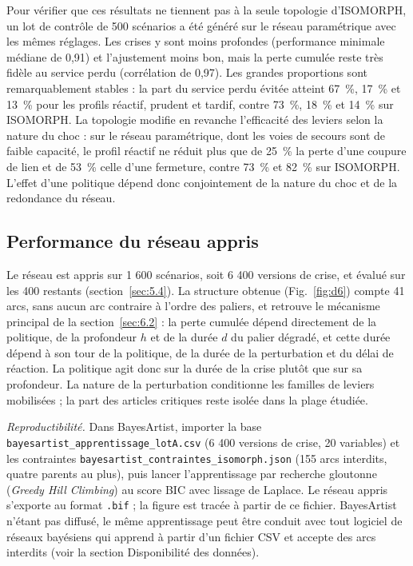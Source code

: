Pour vérifier que ces résultats ne tiennent pas à la seule topologie d'ISOMORPH, un lot de contrôle de 500 scénarios a été généré sur le réseau paramétrique avec les mêmes réglages. Les crises y sont moins profondes (performance minimale médiane de 0,91) et l'ajustement moins bon, mais la perte cumulée reste très fidèle au service perdu (corrélation de 0,97). Les grandes proportions sont remarquablement stables : la part du service perdu évitée atteint 67~\%, 17~\% et 13~\% pour les profils réactif, prudent et tardif, contre 73~\%, 18~\% et 14~\% sur ISOMORPH. La topologie modifie en revanche l'efficacité des leviers selon la nature du choc : sur le réseau paramétrique, dont les voies de secours sont de faible capacité, le profil réactif ne réduit plus que de 25~\% la perte d'une coupure de lien et de 53~\% celle d'une fermeture, contre 73~\% et 82~\% sur ISOMORPH. L'effet d'une politique dépend donc conjointement de la nature du choc et de la redondance du réseau.

\subsection{Performance du réseau appris}
\label{sec:6.3}

Le réseau est appris sur 1 600 scénarios, soit 6 400 versions de crise, et évalué sur les 400 restants (section~\ref{sec:5.4}). La structure obtenue (Fig.~\ref{fig:d6}) compte 41 arcs, sans aucun arc contraire à l'ordre des paliers, et retrouve le mécanisme principal de la section~\ref{sec:6.2} : la perte cumulée dépend directement de la politique, de la profondeur $h$ et de la durée $d$ du palier dégradé, et cette durée dépend à son tour de la politique, de la durée de la perturbation et du délai de réaction. La politique agit donc sur la durée de la crise plutôt que sur sa profondeur. La nature de la perturbation conditionne les familles de leviers mobilisées ; la part des articles critiques reste isolée dans la plage étudiée.

\begin{center}

\label{fig:d6}
\end{center}

\textit{Reproductibilité.} Dans BayesArtist, importer la base \texttt{bayesartist\_apprentissage\_lotA.csv} (6 400 versions de crise, 20 variables) et les contraintes \texttt{bayesartist\_contraintes\_isomorph.json} (155 arcs interdits, quatre parents au plus), puis lancer l'apprentissage par recherche gloutonne (\textit{Greedy Hill Climbing}) au score BIC avec lissage de Laplace. Le réseau appris s'exporte au format \texttt{.bif} ; la figure est tracée à partir de ce fichier. BayesArtist n'étant pas diffusé, le même apprentissage peut être conduit avec tout logiciel de réseaux bayésiens qui apprend à partir d'un fichier CSV et accepte des arcs interdits (voir la section Disponibilité des données).


